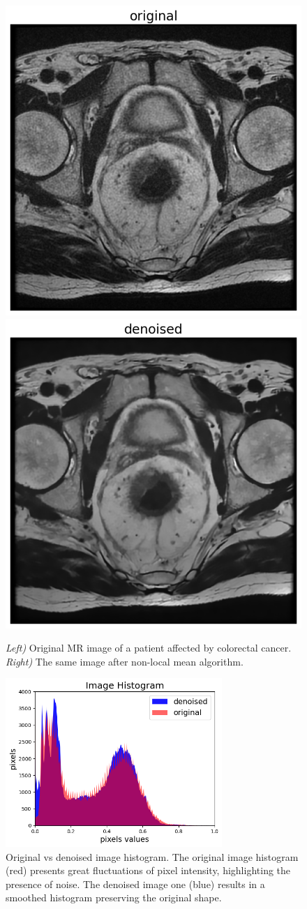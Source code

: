 \documentclass{standalone}
\begin{document}
\begin{figure}[htp]

    \centering
    \includegraphics[width=.49\textwidth]{../images/noisy.png}
    \includegraphics[width=.49\textwidth]{../images/denoised.png}
    
    \caption{ \textit{ Left)} Original MR image of a patient affected by colorectal cancer.\textit{ Right)} The same image after non-local mean algorithm.}
    \label{noisydenoised}
    
    \end{figure}

\begin{figure}[htp]

    \centering
    \includegraphics[width=0.73\textwidth]{../images/histogram.png}

    
    \caption{Original vs denoised image histogram. The original image histogram (red) presents great fluctuations of pixel intensity, highlighting the presence of noise. The denoised image one (blue) results in a smoothed histogram preserving the original shape.}
    \label{histo}
    
    \end{figure}
\end{document}
